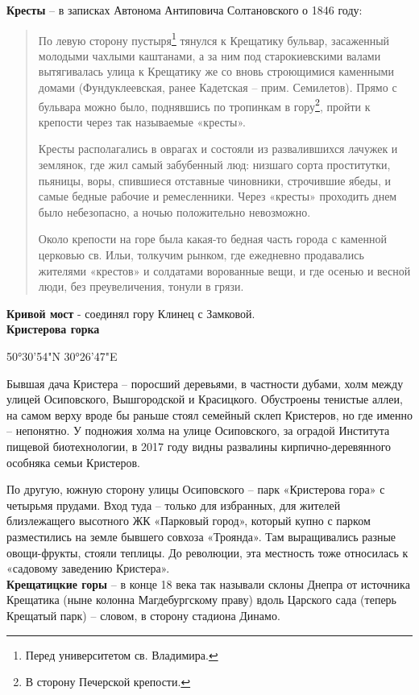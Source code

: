 \textbf{Кресты} – в записках Автонома Антиповича Солтановского о 1846 году:

\begin{quotation}
По левую сторону пустыря\footnote{Перед университетом св. Владимира.} тянулся к Крещатику бульвар, засаженный молодыми чахлыми каштанами, а за ним под старокиевскими валами вытягивалась улица к Крещатику же со вновь строющимися каменными домами (Фундуклеевская, ранее Кадетская – прим. Семилетов). Прямо с бульвара можно было, поднявшись по тропинкам в гору\footnote{В сторону Печерской крепости.}, пройти к крепости через так называемые «кресты».

Кресты располагались в оврагах и состояли из развалившихся лачужек и землянок, где жил самый забубенный люд: низшаго сорта проститутки, пьяницы, воры, спившиеся отставные чиновники, строчившие ябеды, и самые бедные рабочие и ремесленники. Через «кресты» проходить днем было небезопасно, а ночью положительно невозможно.

Около крепости на горе была какая-то бедная часть города с каменной церковью св. Ильи, толкучим рынком, где ежедневно продавались жителями «крестов» и солдатами ворованные вещи, и где осенью и весной люди, без преувеличения, тонули в грязи.
\end{quotation}

\textbf{Кривой мост} - соединял гору Клинец с Замковой.\\

\textbf{Кристерова горка} 

50°30'54"N 30°26'47"E

Бывшая дача Кристера – поросший деревьями, в частности дубами, холм между улицей Осиповского, Вышгородской и Красицкого. Обустроены тенистые аллеи, на самом верху вроде бы раньше стоял семейный склеп Кристеров, но где именно – непонятно. У подножия холма на улице Осиповского, за оградой Института пищевой биотехнологии, в 2017 году видны развалины кирпично-деревянного особняка семьи Кристеров.

По другую, южную сторону улицы Осиповского – парк «Кристерова гора» с четырьмя прудами. Вход туда – только для избранных, для жителей близлежащего высотного ЖК «Парковый город», который купно с парком разместились на земле бывшего совхоза «Троянда». Там выращивались разные овощи-фрукты, стояли теплицы. До революции, эта местность тоже относилась к «садовому заведению Кристера».\\

\textbf{Крещатицкие горы} – в конце 18 века так называли склоны Днепра от источника Крещатика (ныне колонна Магдебургскому праву) вдоль Царского сада (теперь Крещатый парк) – словом, в сторону стадиона Динамо.\\

